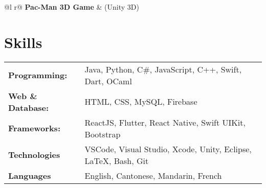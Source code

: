 \documentclass[a4paper,12pt]{article}
\begin{document}
\begin{tabularx}{\linewidth}{ @{}l r@{} }
\textbf{Pac-Man 3D Game} & \hfill (Unity 3D) \\[3.75pt]
\end{tabularx}


\section{Skills}
\begin{tabularx}{\linewidth}{@{}l X@{}}
\textbf{Programming:} &  \normalsize{Java, Python, C\#, JavaScript, C++, Swift, Dart, OCaml}\\
\textbf{Web \& Database:} &  \normalsize{HTML, CSS, MySQL, Firebase}\\
\textbf{Frameworks:} &  \normalsize{ReactJS, Flutter, React Native, Swift UIKit, Bootstrap}\\
\textbf{Technologies}  &  \normalsize{VSCode, Visual Studio, Xcode, Unity, Eclipse, \LaTeX, Bash, Git}\\  
\textbf{Languages}  &  \normalsize{English, Cantonese, Mandarin, French}\\
\end{tabularx}
\end{document}
